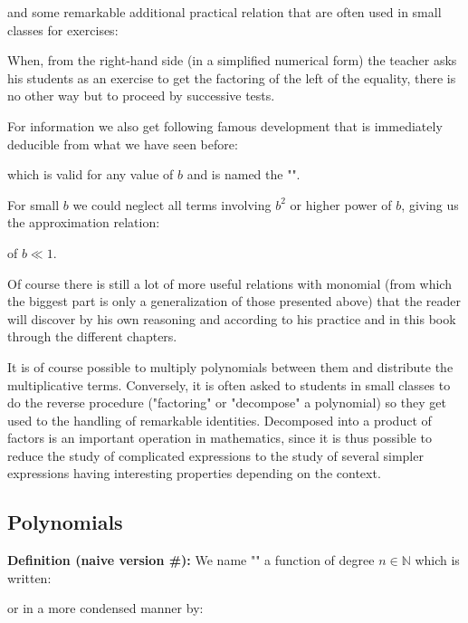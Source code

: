 	and some remarkable additional practical relation that are often used in small classes for exercises:
	
	\begin{tcolorbox}[title=Remark,colframe=black,arc=10pt]
	When, from the right-hand side (in a simplified numerical form) the teacher asks his students as an exercise to get the factoring of the left of the equality, there is no other way but to proceed by successive tests.
	\end{tcolorbox}
	For information we also get following famous development that is immediately deducible from what we have seen before:
	
	which is valid for any value of $b$ and is named the "". 
	
	For small $b$ we could neglect all terms involving $b^2$ or higher power of $b$, giving us the approximation relation:
	
	of $b\ll 1$.
	
	Of course there is still a lot of more useful relations with monomial (from which the biggest part is only a generalization of those presented above) that the reader will discover by his own reasoning and according to his practice and in this book through the different chapters.
	\begin{tcolorbox}[title=Remark,colframe=black,arc=10pt]
	It is of course possible to multiply polynomials between them and distribute the multiplicative terms. Conversely, it is often asked to students in small classes to do the reverse procedure ("factoring" or "decompose" a polynomial) so they get used to the handling of remarkable identities. Decomposed into a product of factors is an important operation in mathematics, since it is thus possible to reduce the study of complicated expressions to the study of several simpler expressions having interesting properties depending on the context.
	\end{tcolorbox}
	
	\subsection{Polynomials}\label{polynomial}
	\textbf{Definition (naive version \#\mydef):} We name "" a function of degree $n\in \mathbb{N}$ which is written:
	
	or in a more condensed manner by:
	
